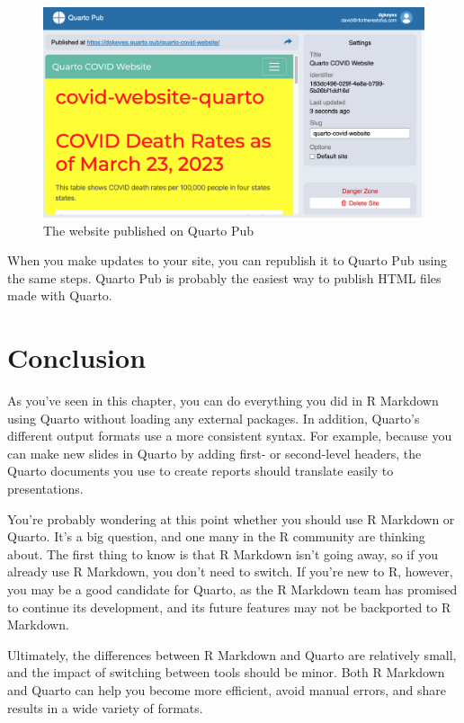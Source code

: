 \documentclass[
]{book}
\begin{document}
\begin{figure}
\includegraphics[width=1\linewidth]{assets/quarto-pub-website} \caption{The website published on Quarto Pub}\label{fig:quarto-pub-website}
\end{figure}

When you make updates to your site, you can republish it to Quarto Pub using the same steps. Quarto Pub is probably the easiest way to publish HTML files made with Quarto.

\hypertarget{conclusion-6}{%
\section*{Conclusion}\label{conclusion-6}}

As you've seen in this chapter, you can do everything you did in R Markdown using Quarto without loading any external packages. In addition, Quarto's different output formats use a more consistent syntax. For example, because you can make new slides in Quarto by adding first- or second-level headers, the Quarto documents you use to create reports should translate easily to presentations.

You're probably wondering at this point whether you should use R Markdown or Quarto. It's a big question, and one many in the R community are thinking about. The first thing to know is that R Markdown isn't going away, so if you already use R Markdown, you don't need to switch. If you're new to R, however, you may be a good candidate for Quarto, as the R Markdown team has promised to continue its development, and its future features may not be backported to R Markdown.

Ultimately, the differences between R Markdown and Quarto are relatively small, and the impact of switching between tools should be minor. Both R Markdown and Quarto can help you become more efficient, avoid manual errors, and share results in a wide variety of formats.
\end{document}
